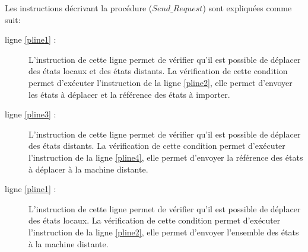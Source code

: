 
\begin{procedure} [H]
	\setcounter{AlgoLine}{0}
\caption{$Send\_ Request(MG:state,MF:state)$}
\end{procedure}
Les instructions décrivant la procédure ($Send\_ Request$) sont expliquées comme suit:
\begin{description}
\item[ligne \ref{pline1} :] L'instruction de cette ligne permet de vérifier qu'il est possible de déplacer des états locaux et des états distants. La vérification de cette condition permet d'exécuter l'instruction de la ligne \ref{pline2}, elle permet d'envoyer les états à déplacer et la référence des états à importer. 
\item[ligne \ref{pline3} :] L'instruction de cette ligne permet de vérifier qu'il est possible de déplacer des états distants. La vérification de cette condition permet d'exécuter l'instruction de la ligne \ref{pline4}, elle permet d'envoyer la référence des états à déplacer à la machine distante. 
\item[ligne \ref{pline1} :] L'instruction de cette ligne permet de vérifier qu'il est possible de déplacer des états locaux. La vérification de cette condition permet d'exécuter l'instruction de la ligne \ref{pline2}, elle permet d'envoyer l'ensemble des états à la machine distante. 
\end{description}

\begin{function}
	\setcounter{AlgoLine}{0}
\caption{$element(s:state)$}
\end{function}

